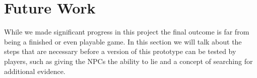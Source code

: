 \section{Future Work} \label{future_work}

While we made significant progress in this project the final outcome is far from being a finished or even playable game.
In this section we will talk about the steps that are necessary before a version of this prototype can be tested by players, such as giving the NPCs the ability to lie and a concept of searching for additional evidence.